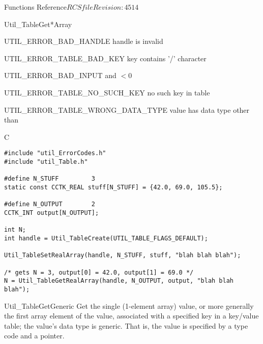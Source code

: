 \begin{cactuspart}{ Functions Reference}{$RCSfile$}{$Revision: 4514 $}
\begin{FunctionDescription}{Util\_TableGet*Array}
\begin{ErrorSection}
\begin{Error}{UTIL\_ERROR\_BAD\_HANDLE}
handle is invalid
\end{Error}
\begin{Error}{UTIL\_ERROR\_TABLE\_BAD\_KEY}
key contains '/' character
\end{Error}
\begin{Error}{UTIL\_ERROR\_BAD\_INPUT}
 and  $< 0$
\end{Error}
\begin{Error}{UTIL\_ERROR\_TABLE\_NO\_SUCH\_KEY}
no such key in table
\end{Error}
\begin{Error}{UTIL\_ERROR\_TABLE\_WRONG\_DATA\_TYPE}
value has data type other than 
\end{Error}
\end{ErrorSection}

\begin{ExampleSection}
\begin{Example}{C}
\begin{verbatim}
#include "util_ErrorCodes.h"
#include "util_Table.h"

#define N_STUFF         3
static const CCTK_REAL stuff[N_STUFF] = {42.0, 69.0, 105.5};

#define N_OUTPUT        2
CCTK_INT output[N_OUTPUT];

int N;
int handle = Util_TableCreate(UTIL_TABLE_FLAGS_DEFAULT);

Util_TableSetRealArray(handle, N_STUFF, stuff, "blah blah blah");

/* gets N = 3, output[0] = 42.0, output[1] = 69.0 */
N = Util_TableGetRealArray(handle, N_OUTPUT, output, "blah blah blah");
\end{verbatim}
\end{Example}
\end{ExampleSection}
\end{FunctionDescription}


\begin{FunctionDescription}{Util\_TableGetGeneric}
\label{Util-TableGetGeneric}
Get the single (1-element array) value, or more generally the
first array element of the value, associated with a specified key
in a key/value table; the value's data type is generic.  That
is, the value is specified by a  type code
and a  pointer.


\end{FunctionDescription}
\end{cactuspart}
